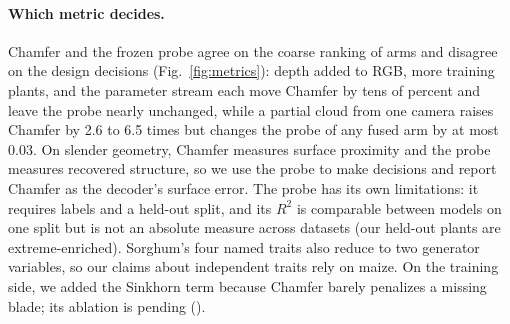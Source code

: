 \paragraph{Which metric decides.}
Chamfer and the frozen probe agree on the coarse ranking of arms and disagree on
the design decisions (Fig.~\ref{fig:metrics}): depth added to RGB, more
training plants, and the parameter stream each move Chamfer by tens of percent
and leave the probe nearly unchanged, while a partial cloud from one camera raises Chamfer by 2.6 to
6.5 times but changes the probe of any fused arm by at most $0.03$. On slender geometry, Chamfer
measures surface proximity and the probe measures recovered structure, so we use
the probe to make decisions and report Chamfer as the decoder's surface error.
The probe has its own limitations: it requires labels and a held-out split, and
its $R^2$ is comparable between models on one split but is not an absolute
measure across datasets (our held-out plants are extreme-enriched). Sorghum's
four named traits also reduce to two generator variables, so our claims about
independent traits rely on maize. On the training side, we added the Sinkhorn
term because Chamfer barely penalizes a missing blade; its ablation is pending
().

